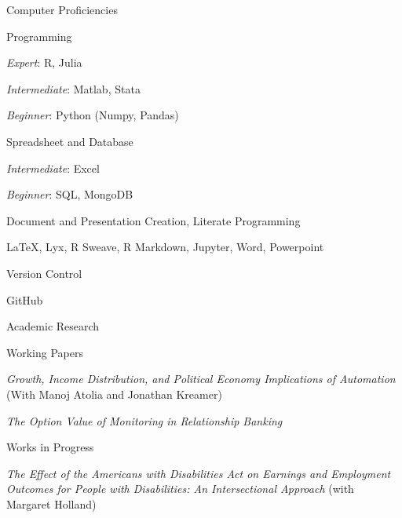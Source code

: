 \documentclass{resume} %
\begin{document}

\begin{rSection}{Computer Proficiencies}

\begin{rSubsection}{Programming}{}{}{}
    \item {\em Expert}: R, Julia
    \item {\em Intermediate}: Matlab, Stata 
    \item {\em Beginner}: Python (Numpy, Pandas)
\end{rSubsection}

\begin{rSubsection}{Spreadsheet and Database}{}{}{}
    \item {\em Intermediate}: Excel 
    \item {\em Beginner}: SQL, MongoDB
\end{rSubsection}

\begin{rSubsection}{Document and Presentation Creation, Literate Programming}{}{}{}
    \item \LaTeX, Lyx, R Sweave, R Markdown, Jupyter, Word, Powerpoint
\end{rSubsection}

\newpage

\begin{rSubsection}{Version Control}{}{}{}
    \item GitHub
\end{rSubsection}

\end{rSection}

\begin{rSection}{Academic Research}

\begin{rSubsection}{Working Papers}{}{}{}
    \item {\em Growth, Income Distribution, and Political Economy Implications of Automation} (With Manoj Atolia and Jonathan Kreamer)
    \item {\em The Option Value of Monitoring in Relationship Banking}
\end{rSubsection}

\begin{rSubsection}{Works in Progress}{}{}{}
    \item {\em The Effect of the Americans with Disabilities Act on Earnings and Employment Outcomes for People with Disabilities: An Intersectional Approach} (with Margaret Holland)
\end{rSubsection}

\end{rSection}
\end{document}

